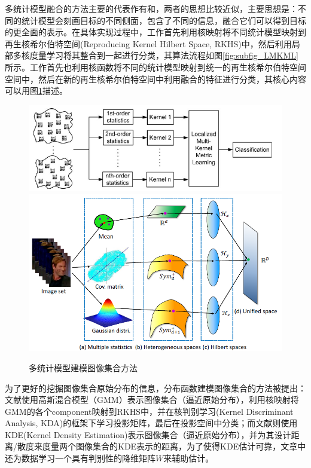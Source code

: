 多统计模型融合的方法主要的代表作有\cite{Statistics_LMKML}和\cite{Statistics_HERML}，两者的思想比较近似，主要思想是：不同的统计模型会刻画目标的不同侧面，包含了不同的信息，融合它们可以得到目标的更全面的表示。在具体实现过程中，工作\cite{Statistics_LMKML}首先利用核映射将不同统计模型映射到再生核希尔伯特空间(Reproducing Kernel Hilbert Space, RKHS)中，然后利用局部多核度量学习将其整合到一起进行分类，其算法流程如图\ref{fig:subfig_LMKML}所示。工作\cite{Statistics_HERML}首先也利用核函数将不同的统计模型映射到统一的再生核希尔伯特空间空间中，然后在新的再生核希尔伯特空间中利用融合的特征进行分类，其核心内容可以用图\ref{fig:Multi_Stat}描述。
\begin{figure}[h]
  \centering
      {\includegraphics[width=0.51\linewidth]{source/Statistics_LMKML.png}}
  \hspace{1em}%
      {\includegraphics[width=0.45\linewidth]{source/Statistics_HERML.png}}
  \caption{多统计模型建模图像集合方法}
  \label{fig:Multi_Stat}
\end{figure}

为了更好的挖掘图像集合原始分布的信息，分布函数建模图像集合的方法被提出：文献\cite{Statistics_DARG}使用高斯混合模型（GMM）表示图像集合（逼近原始分布），利用核映射将GMM的各个component映射到RKHS中，并在核判别学习(Kernel Discriminant Analysis, KDA)\cite{Kernel_KDA}的框架下学习投影矩阵，最后在投影空间中分类；而文献\cite{Statistics_BeyondGauss}则使用KDE(Kernel Density Estimation)表示图像集合（逼近原始分布），并为其设计距离/散度来度量两个图像集合的KDE表示的距离，为了使得KDE估计可靠，文章中还为数据学习一个具有判别性的降维矩阵$W$来辅助估计。

